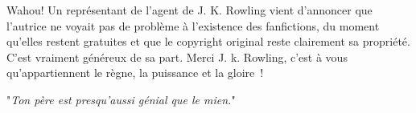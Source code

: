 Wahou! Un représentant de l'agent de J. K. Rowling vient d'annoncer que l'autrice ne voyait pas de problème à l'existence des fanfictions, du moment qu'elles restent gratuites et que le copyright original reste clairement sa propriété. C'est vraiment généreux de sa part. Merci J. k. Rowling, c'est à vous qu'appartiennent le règne, la puissance et la gloire~!


"\emph{Ton père est presqu'aussi génial que le mien.}"

